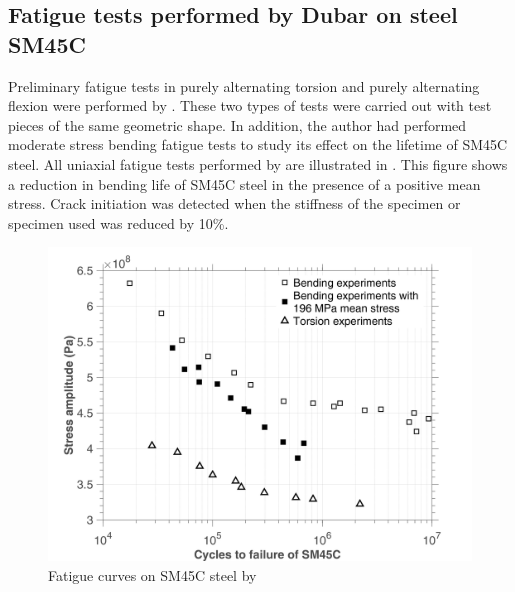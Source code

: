 \subsection{Fatigue tests performed by Dubar on steel SM45C}
Preliminary fatigue tests in purely alternating torsion and purely alternating flexion were performed by \cite{lee2013out}. These two types of tests were carried out with test pieces of the same geometric shape. In addition, the author had performed moderate stress bending fatigue tests to study its effect on the lifetime of SM45C steel. All uniaxial fatigue tests performed by \cite{lee2013out} are illustrated in . This figure shows a reduction in bending life of SM45C steel in the presence of a positive mean stress. Crack initiation was detected when the stiffness of the specimen or specimen used was reduced by 10\%.
\begin{figure}[!h]
\centering
\includegraphics[width=\textwidth]{figures//SM45C_SN.png} 
\caption{Fatigue curves on SM45C steel by \cite{lee2013out}}
\label{fig.SM45CSN}
\end{figure}


